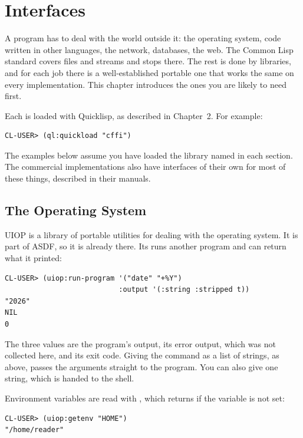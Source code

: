 \chapter{Interfaces}

A program has to deal with the world outside it: the operating system,
code written in other languages, the network, databases, the web. The
Common Lisp standard covers files and streams and stops there. The
rest is done by libraries, and for each job there is a well-established
portable one that works the same on every implementation. This
chapter introduces the ones you are likely to need first.

Each is loaded with Quicklisp, as described in Chapter~2. For
example:

\begin{verbatim}
CL-USER> (ql:quickload "cffi")
\end{verbatim}

\noindent
The examples below assume you have loaded the library named in each
section. The commercial implementations also have interfaces of their
own for most of these things, described in their manuals.

\section{The Operating System}

UIOP is a library of portable utilities for dealing with the
operating system. It is part of ASDF, so it is already there. Its
 runs another program and can return what it
printed:

\begin{verbatim}
CL-USER> (uiop:run-program '("date" "+%Y")
                           :output '(:string :stripped t))
"2026"
NIL
0
\end{verbatim}

The three values are the program's output, its error output, which was
not collected here, and its exit code. Giving the command as a list
of strings, as above, passes the arguments straight to the program.
You can also give one string, which is handed to the shell.

Environment variables are read with , which returns
 if the variable is not set:

\begin{verbatim}
CL-USER> (uiop:getenv "HOME")
"/home/reader"
\end{verbatim}

